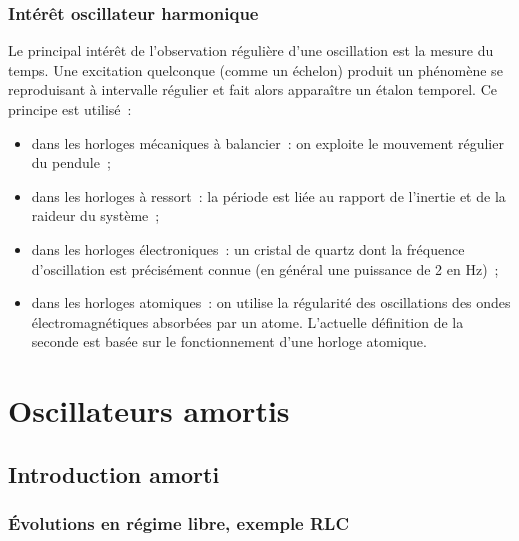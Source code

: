 \documentclass[../../main/main.tex]{subfiles}
\begin{document}
\subsubsection{Intérêt oscillateur harmonique}

Le principal intérêt de l'observation régulière d'une oscillation est la mesure
du temps. Une excitation quelconque (comme un échelon) produit un phénomène se
reproduisant à intervalle régulier et fait alors apparaître un étalon
temporel. Ce principe est utilisé~:
\begin{itemize}
	\item dans les horloges mécaniques à balancier~: on exploite le mouvement
	      régulier du pendule~;
	\item dans les horloges à ressort~: la période est liée au rapport de
	      l'inertie et de la raideur du système~;
	\item dans les horloges électroniques~: un cristal de quartz dont la
	      fréquence d'oscillation est précisément connue (en général une puissance
	      de 2 en Hz)~;
	\item dans les horloges atomiques~: on utilise la régularité des
	      oscillations des ondes électromagnétiques absorbées par un atome.
	      L'actuelle définition de la seconde est basée sur le fonctionnement
	      d'une horloge atomique.
\end{itemize}

\section{Oscillateurs amortis}
\subsection{Introduction amorti}

\subsubsection{Évolutions en régime libre, exemple RLC}
\end{document}
